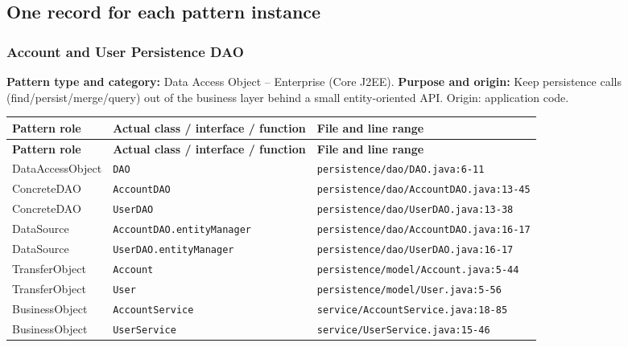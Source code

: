\documentclass[11pt,a4paper]{article}
\begin{document}
\subsection{One record for each pattern instance}
\subsubsection{Account and User Persistence DAO}
\textbf{Pattern type and category:} Data Access Object -- Enterprise (Core J2EE). \textbf{Purpose and origin:} Keep persistence calls (find/persist/merge/query) out of the business layer behind a small entity-oriented API. Origin: application code.
{\footnotesize
\begin{longtable}{@{}p{3.1cm}p{5.6cm}p{7cm}@{}}
\toprule \textbf{Pattern role} & \textbf{Actual class / interface / function} & \textbf{File and line range} \\ \midrule \endfirsthead
\toprule \textbf{Pattern role} & \textbf{Actual class / interface / function} & \textbf{File and line range} \\ \midrule \endhead
\bottomrule \endfoot
DataAccessObject & \texttt{DAO} & \texttt{persistence/\allowbreak{}dao/\allowbreak{}DAO.\allowbreak{}java:\allowbreak{}6-11} \\
ConcreteDAO & \texttt{AccountDAO} & \texttt{persistence/\allowbreak{}dao/\allowbreak{}AccountDAO.\allowbreak{}java:\allowbreak{}13-45} \\
ConcreteDAO & \texttt{UserDAO} & \texttt{persistence/\allowbreak{}dao/\allowbreak{}UserDAO.\allowbreak{}java:\allowbreak{}13-38} \\
DataSource & \texttt{AccountDAO.\allowbreak{}entityManager} & \texttt{persistence/\allowbreak{}dao/\allowbreak{}AccountDAO.\allowbreak{}java:\allowbreak{}16-17} \\
DataSource & \texttt{UserDAO.\allowbreak{}entityManager} & \texttt{persistence/\allowbreak{}dao/\allowbreak{}UserDAO.\allowbreak{}java:\allowbreak{}16-17} \\
TransferObject & \texttt{Account} & \texttt{persistence/\allowbreak{}model/\allowbreak{}Account.\allowbreak{}java:\allowbreak{}5-44} \\
TransferObject & \texttt{User} & \texttt{persistence/\allowbreak{}model/\allowbreak{}User.\allowbreak{}java:\allowbreak{}5-56} \\
BusinessObject & \texttt{AccountService} & \texttt{service/\allowbreak{}AccountService.\allowbreak{}java:\allowbreak{}18-85} \\
BusinessObject & \texttt{UserService} & \texttt{service/\allowbreak{}UserService.\allowbreak{}java:\allowbreak{}15-46} \\

\end{longtable}}
\end{document}
